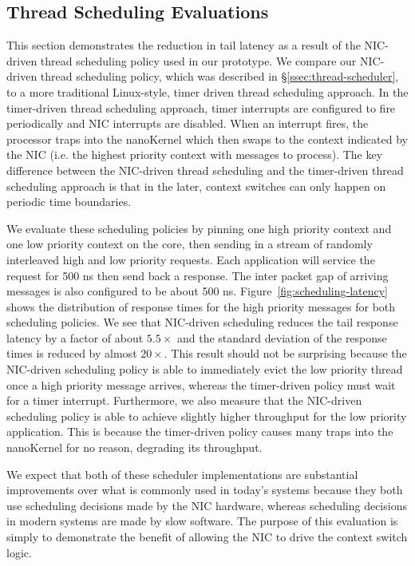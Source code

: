 \subsection{Thread Scheduling Evaluations}
This section demonstrates the reduction in tail latency as a result of the NIC-driven thread scheduling policy used in our \name{} prototype.
We compare our NIC-driven thread scheduling policy, which was described in \S\ref{ssec:thread-scheduler}, to a more traditional Linux-style, timer driven thread scheduling approach.
In the timer-driven thread scheduling approach, timer interrupts are configured to fire periodically and NIC interrupts are disabled.
When an interrupt fires, the processor traps into the nanoKernel which then swaps to the context indicated by the NIC (i.e. the highest priority context with messages to process).
The key difference between the NIC-driven thread scheduling and the timer-driven thread scheduling approach is that in the later, context switches can only happen on periodic time boundaries.

We evaluate these scheduling policies by pinning one high priority context and one low priority context on the core, then sending in a stream of randomly interleaved high and low priority requests.
Each application will service the request for 500 ns then send back a response.
The inter packet gap of arriving messages is also configured to be about 500 ns.
Figure~\ref{fig:scheduling-latency} shows the distribution of response times for the high priority messages for both scheduling policies.
We see that NIC-driven scheduling reduces the tail response latency by a factor of about $5.5\times$ and the standard deviation of the response times is reduced by almost $20\times$.
This result should not be surprising because the NIC-driven scheduling policy is able to immediately evict the low priority thread once a high priority message arrives, whereas the timer-driven policy must wait for a timer interrupt.
Furthermore, we also measure that the NIC-driven scheduling policy is able to achieve slightly higher throughput for the low priority application.
This is because the timer-driven policy causes many traps into the nanoKernel for no reason, degrading its throughput.

We expect that both of these scheduler implementations are substantial improvements over what is commonly used in today's systems because they both use scheduling decisions made by the NIC hardware, whereas scheduling decisions in modern systems are made by slow software.
The purpose of this evaluation is simply to demonstrate the benefit of allowing the NIC to drive the context switch logic.

